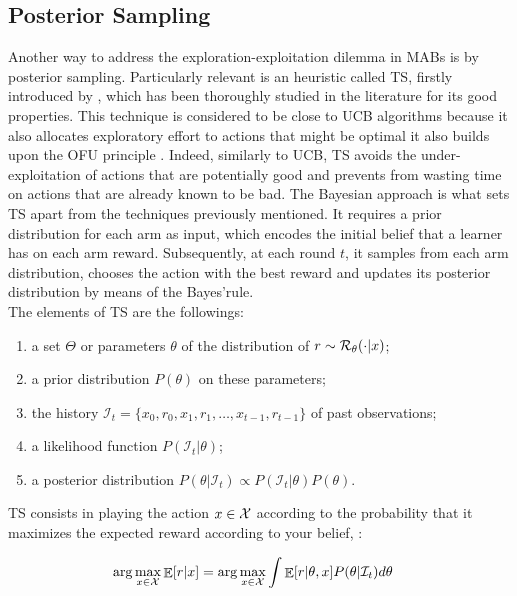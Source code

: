 \subsection{Posterior Sampling}
Another way to address the exploration-exploitation dilemma in \gls{MAB}s is by posterior sampling. Particularly relevant is an heuristic called \gls{TS}, firstly introduced by \cite{thompson1933likelihood}, which has been thoroughly studied in the literature for its good properties. This technique is considered to be close to \gls{UCB} algorithms because it also allocates exploratory effort to actions that might be optimal \ie it also builds upon the \gls{OFU} principle \cite{russo2013eluder}. Indeed, similarly to \gls{UCB}, \gls{TS} avoids the under-exploitation of actions that are potentially good and prevents from wasting time on actions that are already known to be bad. The Bayesian approach is what sets \gls{TS} apart from the techniques previously mentioned. It requires a prior distribution for each arm as input, which encodes the initial belief that a learner has on each arm reward. Subsequently, at each round $t$, it samples from each arm distribution, chooses the action with the best reward and updates its posterior distribution by means of the Bayes'rule.\\ The elements of \gls{TS} are the followings:

\begin{enumerate}
\item a set $\Theta$ or parameters $\theta$ of the distribution of $r\sim\mathcal{R}_{\theta}(\cdot|x)$;
\item a prior distribution $P(\theta)$ on these parameters;
\item the history $\mathcal{I}_t = \{x_0, r_0, x_1, r_1, \dots, x_{t-1}, r_{t-1}\}$ of past observations;
\item a likelihood function $P(\mathcal{I}_t|\theta)$;
\item a posterior distribution $P(\theta|\mathcal{I}_t)\propto P(\mathcal{I}_t|\theta)P(\theta)$.
\end{enumerate}

\gls{TS} consists in playing the action $x\in\mathcal{X}$ according to the probability that it maximizes the expected reward according to your belief, \ie:

\begin{align}
\arg\max_{x\in\mathcal{X}}\mathop{\mathbb{E}}[r|x] &= \arg\max_{x\in\mathcal{X}}\int\mathop{\mathbb{E}}[r|\theta,x]P(\theta|\mathcal{I}_t)d\theta
\end{align}

